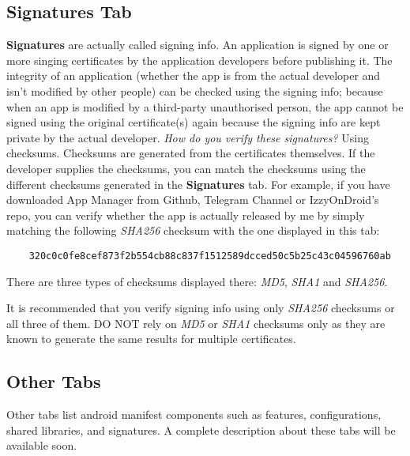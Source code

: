 \subsection{Signatures Tab}\label{subsec:signatures-tab}
\textbf{Signatures} are actually called signing info. An application is signed by one or more singing certificates by
the application developers before publishing it. The integrity of an application (whether the app is from the actual
developer and isn't modified by other people) can be checked using the signing info; because when an app is modified by
a third-party unauthorised person, the app cannot be signed using the original certificate(s) again because the signing
info are kept private by the actual developer. \textit{How do you verify these signatures?} Using checksums. Checksums
are generated from the certificates themselves. If the developer supplies the checksums, you can match the checksums
using the different checksums generated in the \textbf{Signatures} tab. For example, if you have downloaded App Manager
from Github, Telegram Channel or IzzyOnDroid's repo, you can verify whether the app is actually released by me by simply
matching the following \textit{SHA256} checksum with the one displayed in this tab:
\begin{Verbatim}
    320c0c0fe8cef873f2b554cb88c837f1512589dcced50c5b25c43c04596760ab
\end{Verbatim}

There are three types of checksums displayed there: \textit{MD5}, \textit{SHA1} and \textit{SHA256}.

\begin{danger}[Caution]
    It is recommended that you verify signing info using only \textit{SHA256} checksums or all three of them. DO NOT
    rely on \textit{MD5} or \textit{SHA1} checksums only as they are known to generate the same results for multiple
    certificates.
\end{danger}

\subsection{Other Tabs}\label{subsec:other-tabs}
Other tabs list android manifest components such as features, configurations, shared libraries, and signatures. A
complete description about these tabs will be available soon.
